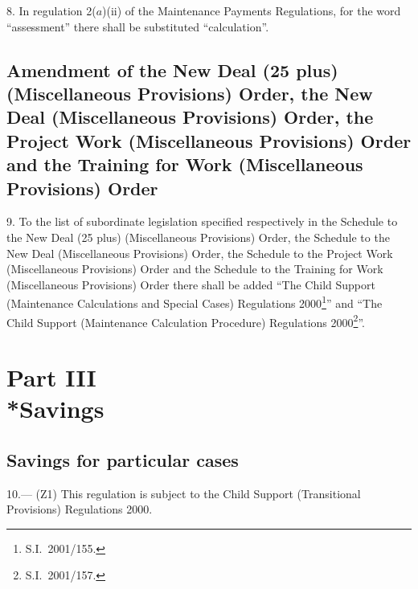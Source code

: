\documentclass[12pt,a4paper]{article}
\begin{document}
8.  In regulation 2($a$)(ii) of the Maintenance Payments Regulations, for the word “assessment” there shall be substituted “calculation”.

\subsection[9. Amendment of the New Deal (25 plus) (Miscellaneous Provisions) Order, the New Deal (Miscellaneous Provisions) Order, the Project Work (Miscellaneous Provisions) Order and the Training for Work (Miscellaneous Provisions) Order]{Amendment of the New Deal (25 plus) (Miscellaneous Provisions) Order, the New Deal (Miscellaneous Provisions) Order, the Project Work (Miscellaneous Provisions) Order and the Training for Work (Miscellaneous Provisions) Order}

\enlargethispage{\baselineskip}

9.  To the list of subordinate legislation specified respectively in the Schedule to the New Deal (25 plus) (Miscellaneous Provisions) Order, the Schedule to the New Deal (Miscellaneous Provisions) Order, the Schedule to the Project Work (Miscellaneous Provisions) Order and the Schedule to the Training for Work (Miscellaneous Provisions) Order there shall be added “The Child Support (Maintenance Calculations and Special Cases) Regulations 2000\footnote{S.I.\ 2001/155.}” and “The Child Support (Maintenance Calculation Procedure) Regulations 2000\footnote{S.I.\ 2001/157.}”.

\section[Part III --- Savings]{Part III\\*Savings}

\renewcommand\parthead{--- Part III}

\subsection[10. Savings for particular cases]{Savings for particular cases}

10.---%
(Z1) This regulation is subject to the Child Support (Transitional Provisions) Regulations 2000.
\end{document}
